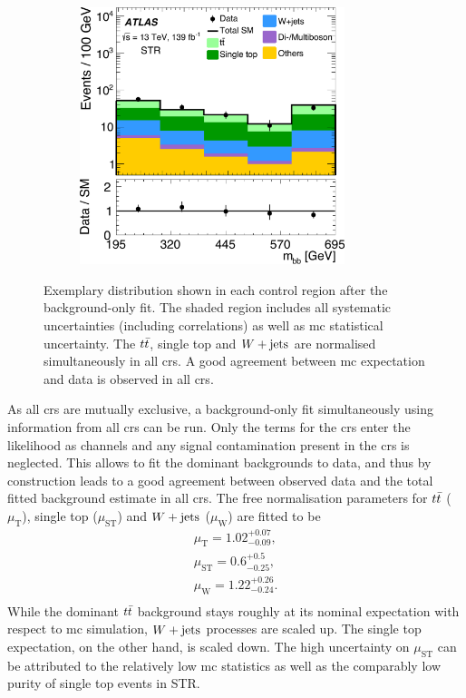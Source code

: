 \begin{figure}
\begin{subfigure}[b]{0.5\linewidth}
		\centering\includegraphics[width=0.85\textwidth]{OneLeptonbb_CR_STCREM_mbb_yellow}
	\end{subfigure}\hfill

	\caption{Exemplary distribution shown in each control region after the background-only fit. The shaded region includes all systematic uncertainties (including correlations) as well as \gls{mc} statistical uncertainty. The $t\bar{t}$, single top and $W+\mathrm{jets}$ are normalised simultaneously in all \glspl{cr}. A good agreement between \gls{mc} expectation and data is observed in all \glspl{cr}.}
	\label{fig:CR_distributions_postfit}
\end{figure}



As all \glspl{cr} are mutually exclusive, a background-only fit simultaneously using information from all \glspl{cr} can be run. Only the terms for the \glspl{cr} enter the likelihood as channels and any signal contamination present in the \glspl{cr} is neglected. This allows to fit the dominant backgrounds to data, and thus by construction leads to a good agreement between observed data and the total fitted background estimate in all \glspl{cr}. The free normalisation parameters for $t\bar{t}$ ($\mu_\mathrm{T}$), single top ($\mu_\mathrm{ST}$) and $W+\mathrm{jets}$ ($\mu_\mathrm{W}$) are fitted to be
\begin{equation}
	\begin{split}
		\mu_\mathrm{T} = 1.02^{+0.07}_{-0.09}, \\
		\mu_\mathrm{ST} = 0.6^{+0.5}_{-0.25}, \\
		\mu_\mathrm{W} = 1.22^{+0.26}_{-0.24}. \\
	\end{split}
\end{equation}
While the dominant $t\bar{t}$ background stays roughly at its nominal expectation with respect to \gls{mc} simulation, $W+\mathrm{jets}$ processes are scaled up. The single top expectation, on the other hand, is scaled down. The high uncertainty on $\mu_\mathrm{ST}$ can be attributed to the relatively low \gls{mc} statistics as well as the comparably low purity of single top events in STR.

